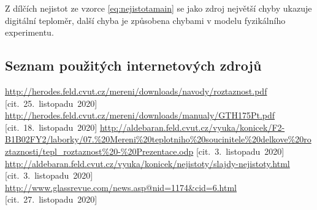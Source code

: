 \documentclass[a4paper,12pt]{article}   %
\begin{document}
Z dílčích nejistot ze vzorce \ref{eq:nejistotamain} se jako zdroj největší chyby ukazuje digitální teploměr, další chyba je způsobena chybami v modelu fyzikálního experimentu.

\clearpage
\renewcommand{\refname}{Seznam použité literatury a~zdrojů informací} 

\begin{thebibliography}{99}

\subsection*{Seznam použitých internetových zdrojů}
     \url{http://herodes.feld.cvut.cz/mereni/downloads/navody/roztaznost.pdf} [cit.~25.~listopadu~2020]
     \url{http://herodes.feld.cvut.cz/mereni/downloads/manualy/GTH175Pt.pdf} [cit.~18.~listopadu~2020]
     \url{http://aldebaran.feld.cvut.cz/vyuka/konicek/F2-B1B02FY2/laborky/07.%20Mereni%20teplotniho%20soucinitele%20delkove%20roztaznosti/tepl_roztaznost%20-%20Prezentace.odp} [cit.~3.~listopadu~2020]
     \url{http://aldebaran.feld.cvut.cz/vyuka/konicek/nejistoty/slajdy-nejistoty.html} [cit.~3.~listopadu~2020]
     \url{http://www.glassrevue.com/news.asp@nid=1174&cid=6.html} [cit.~27.~listopadu~2020]
\end{thebibliography}
\end{document}
